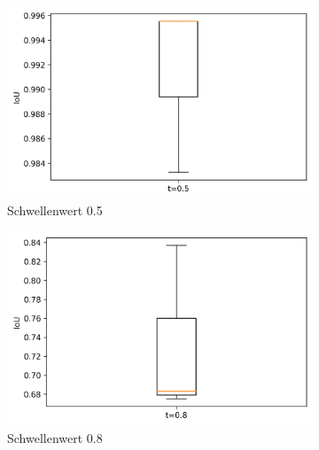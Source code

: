 	\begin{figure}[h]
		\centering
		\begin{subfigure}[c]{0.32\textwidth}			
			\includegraphics[width=1\textwidth,center]{bilder/Hauptteil/MT_Grapple/IoU_05_MT_Grapple.png}
			\caption{Schwellenwert 0.5}
			\label{img:BoxPlot_05_MT-Ansatz}	
		\end{subfigure}
		\centering
		\begin{subfigure}[c]{0.32\textwidth}			
			\includegraphics[width=1\textwidth,center]{bilder/Hauptteil/MT_Grapple/IoU_08_MT_Grapple.png}
			\caption{Schwellenwert 0.8}
			\label{img:BoxPlot_08_MT-Ansatz}	
		\end{subfigure}
		\begin{subfigure}[c]{0.32\textwidth}			

\end{subfigure}
\end{figure}
